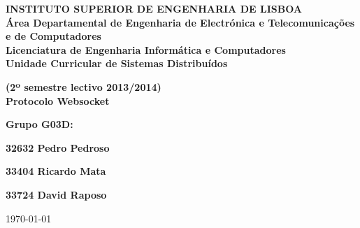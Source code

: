 \documentclass[a4paper]{article}
\begin{document}
\begin{titlepage}

\newcommand{\HRule}{\rule{\linewidth}{0.5mm}} %

\center %
 

\textbf{\Large INSTITUTO SUPERIOR DE ENGENHARIA DE LISBOA}\\[1cm] %
\textbf{ Área Departamental de Engenharia de Electrónica e Telecomunicações e de Computadores 
}\\[0.5cm] %

\textbf{Licenciatura de Engenharia Informática e Computadores}\\[2.5cm]


\textbf{\large Unidade Curricular de Sistemas Distribuídos }

\textbf{(2º semestre lectivo 2013/2014)}\\[3cm]


\textbf{\huge Protocolo Websocket}\\[5cm]
 




{\raggedright{}
	\textbf{Grupo G03D:}
	
	\textbf{32632 Pedro Pedroso} 

	\textbf{33404 Ricardo Mata}

	\textbf{33724 David Raposo}\\[5cm]
}



{\large \today}\\[3cm] %

\vfill %

\end{titlepage}
\end{document}
